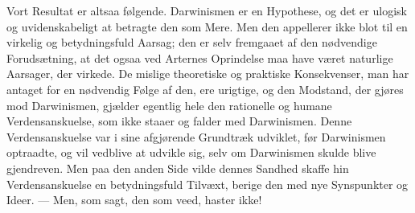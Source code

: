 \documentclass[12pt,a4paper]{article}
\begin{document}
Vort Resultat er altsaa følgende. Darwinismen er en
Hypothese, og det er ulogisk og uvidenskabeligt at betragte
den som Mere. Men den appellerer ikke blot til en virkelig
og betydningsfuld Aarsag; den er selv fremgaaet af den
nødvendige Forudsætning, at det ogsaa ved Arternes
Oprindelse maa have været naturlige Aarsager, der virkede.
De mislige theoretiske og praktiske Konsekvenser, man har
antaget for en nødvendig Følge af den, ere urigtige, og den
Modstand, der gjøres mod Darwinismen, gjælder egentlig
hele den rationelle og humane Verdensanskuelse, som ikke
staaer og falder med Darwinismen. Denne Verdensanskuelse
var i sine afgjørende Grundtræk udviklet, før Darwinismen
optraadte, og vil vedblive at udvikle sig, selv om
Darwinismen skulde blive gjendreven. Men paa den anden
Side vilde dennes Sandhed skaffe hin Verdensanskuelse en
betydningsfuld Tilvæxt, berige den med nye
Synspunkter og Ideer. --- Men, som sagt, den som veed,
haster ikke!
\end{document}
